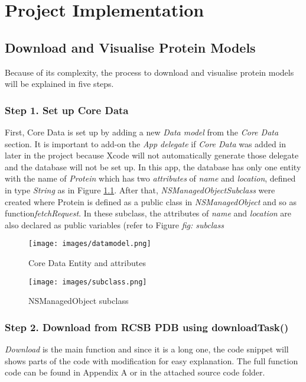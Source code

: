 \chapter{Project Implementation}
\label{ch:implementation}

\section{Download and Visualise Protein Models}
Because of its complexity, the process to download and visualise protein models will be explained in five steps.
\subsection{Step 1. Set up Core Data}
First, Core Data is set up by adding a new \emph{Data model} from the \emph{Core Data} section. It is important to add-on the \emph{App delegate} if \emph{Core Data} was added in later in the project because Xcode will not automatically generate those delegate and the database will not be set up. In this app, the database has only one entity with the name of \emph{Protein} which has two \emph{attributes} of \emph{name} and \emph{location}, defined in type \emph{String} as in Figure \ref{fig:datamodel}. After that, \emph{NSManagedObjectSubclass} were created where Protein is defined as a public class in \emph{NSManagedObject} and so as function\emph{fetchRequest}.  In these subclass, the attributes of \emph{name} and \emph{location} are also declared as public variables (refer to Figure \emph{fig: subclass}
 \begin{figure}[!htp]
	\centering
	\texttt{[image: images/datamodel.png]}
	\caption{Core Data Entity and attributes}
	\label{fig:datamodel}
\end{figure}

 \begin{figure}[!htp]
	\centering
	\texttt{[image: images/subclass.png]}
	\caption{NSManagedObject subclass}
	\label{fig:subclass}
\end{figure}

\subsection{Step 2. Download from RCSB PDB using downloadTask()}
\emph{Download} is the main function and since it is a long one, the code snippet will shows parts of the code with modification for easy explanation. The full function code can be found in Appendix A or in the attached source code folder. 

